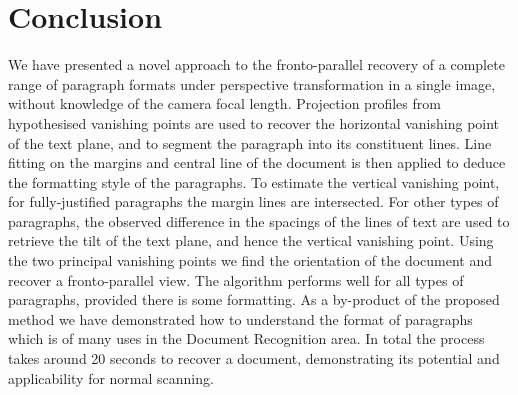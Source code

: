 \documentclass{elsart}   %
\begin{document}





\section{Conclusion} \label{conclusions}
We have presented a novel approach to the fronto-parallel recovery of a complete
range of  paragraph formats under perspective transformation in a
single image, without knowledge of the camera focal length.   Projection
profiles from hypothesised vanishing points are used to  recover the
horizontal vanishing point of the text plane, and to segment the paragraph into
its constituent lines.  Line fitting on the margins and central line of the
document is then applied to deduce the formatting style of the paragraphs.  To
estimate the vertical vanishing point, for fully-justified paragraphs the margin
lines are intersected.  For other types of paragraphs, the observed difference
in the spacings of the lines of text are used to retrieve the tilt of the text
plane, and hence the vertical vanishing point.  Using the two principal
vanishing points we find the orientation of the document and recover a
fronto-parallel view.  The algorithm performs well for all types of paragraphs,
provided there is some  formatting. As a by-product of the proposed
method we have demonstrated how to understand the format of paragraphs which is
 of many uses in the Document Recognition area.
In total the process takes around 20 seconds to recover a document,
demonstrating its potential and applicability 
for normal scanning.

\end{document}
